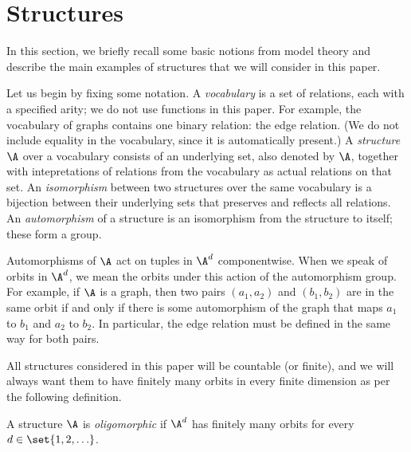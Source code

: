 \section{Structures}\label{sec:structures}

In this section, we briefly recall some basic notions from model theory and describe the main examples of structures that we will consider in this paper.

Let us begin by fixing some notation.
A \emph{vocabulary} is a set of relations, each with a specified arity; we do not use functions in this paper. 
For example, the vocabulary of graphs contains one binary relation: the edge relation. 
(We do not include equality in the vocabulary, since it is automatically present.) 
A \emph{structure} $\A$ over a vocabulary consists of an underlying set, also denoted by $\A$, together with intepretations of relations from the vocabulary as actual relations on that set. 
An \emph{isomorphism} between two structures over the same vocabulary is a bijection between their underlying sets that preserves and reflects all relations. 
An \emph{automorphism} of a structure is an isomorphism from the structure to itself; these form a group. 

Automorphisms of $\A$ act on tuples in $\A^d$ componentwise. 
When we speak of orbits in $\A^d$, we mean the orbits under this action of the automorphism group. 
For example, if $\A$ is a graph, then two pairs $(a_1,a_2)$ and $(b_1,b_2)$ are in the same orbit if and only if there is some automorphism of the graph that maps $a_1$ to $b_1$ and $a_2$ to $b_2$. 
In particular, the edge relation must be defined in the same way for both pairs.

All structures considered in this paper will be countable (or finite), and we will always want them to have finitely many orbits in every finite dimension as per the following definition.

\begin{definition}\label{def:oligomorphic-structure}
    A structure $\A$ is \emph{oligomorphic} if $\A^d$ has finitely many orbits for every $d \in \set{1,2,\ldots}$.
\end{definition}

